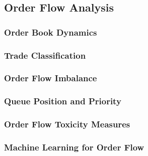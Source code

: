
\subsection{Order Flow Analysis}

\subsubsection{Order Book Dynamics}

\subsubsection{Trade Classification}

\subsubsection{Order Flow Imbalance}

\subsubsection{Queue Position and Priority}

\subsubsection{Order Flow Toxicity Measures}

\subsubsection{Machine Learning for Order Flow}
